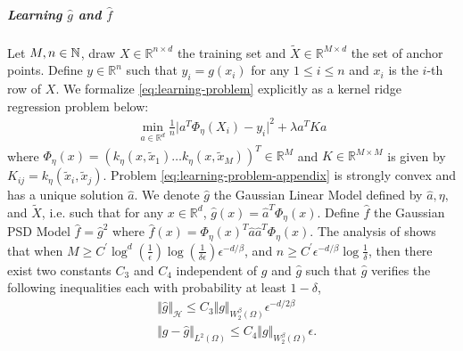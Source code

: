 \subparagraph{Learning $\hat g$ and $\hat f$} Let $M, n \in \mathbb N$, draw $X\in\mathbb R^{n \times d}$ the training set and $\tilde X \in \mathbb R^{M \times d}$ the set of anchor points. Define $y \in \mathbb R^n$ such that $y_i = g(x_i)$ for any $1 \leq i \leq n$ and $x_i$ is the $i$-th row of $X$.
%
We formalize \cref{eq:learning-problem} explicitly as a kernel ridge regression problem below:
%
\begin{align}\label{eq:learning-problem-appendix}
    \min_{a\in\mathbb R^d} \frac{1}{n} \vert a^T\Phi_{\eta}(X_i) - y_i\vert^2 + \lambda a^TK a
\end{align}
%
where $\Phi_\eta(x) = (k_\eta(x, \tilde x_1) \dots k_\eta(x, \tilde x_M))^T\in\mathbb R^M$ and $K\in\mathbb R^{M\times M}$ is given by $K_{ij}=k_\eta(\tilde x_i, \tilde x_j)$.
%
Problem \cref{eq:learning-problem-appendix} is strongly convex and has a unique solution $\hat a$.
%
We denote $\hat g$ the Gaussian Linear Model defined by $\hat a, \eta,$ and $\tilde X$, i.e. such that for any $x \in\mathbb R^d$, $\hat g(x) = \hat a^T\Phi_\eta(x)$. Define $\hat f$ the Gaussian PSD Model $\hat f= \hat g^2$ where $\hat f(x) = \Phi_\eta(x)^T\hat a\hat a^T\Phi_\eta(x)$.
%
The analysis of \cite{sampling-ulysse} shows that when $M \geq C^\prime \log^d(\frac{1}{\epsilon})\log(\frac{1}{\delta\epsilon})\epsilon^{-d/\beta}$, and $n \geq C^\prime \epsilon^{-d/\beta}\log \frac{1}{\delta}$, then there exist two constants $C_3$ and $C_4$ independent of $g$ and $\hat g$ such that $\hat g$ verifies the following inequalities each with probability at least $1-\delta$,
\begin{align}
   &\Vert \hat g\Vert_\mathcal H\leq C_3\Vert g\Vert_{W^\beta_2(\Omega)}\epsilon^{-d/2\beta}\label{eq:hat-g}\\
    &\Vert g - \hat g\Vert_{L^2(\Omega)} \leq C_4 \Vert g\Vert_{W^\beta_2(\Omega)}\epsilon.\label{eq:g-hat-g}
\end{align}

